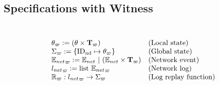 \subsection{Specifications with Witness} 
\label{chapter:witnesspassing:subsec:specifications-with-witness}

\begin{figure}
\raggedright
\noindent{}\\
$$
\begin{array}{ll}
\theta_\varpi:= (\theta \times {\textbf{T}_{\varpi}})  & \mbox{(Local state)} \\
\Sigma_\varpi := \{\mathrm{ID_{nd}} \mapsto \theta_\varpi\} & \mbox{(Global state)}\\
{\mathbb{E}_{net}}_\varpi:= {\mathbb{E}_{net}}~\vert~({\mathbb{E}_{net}} \times  {\textbf{T}_{\varpi}}) & \mbox{(Network event)}\\
{{l_{net}}}_{\varpi}:= \mbox{list}\ {\mathbb{E}_{net}}_\varpi & \mbox{(Network log)}\\
\mathbb{R}_\varpi : {{l_{net}}}_{\varpi} \rightarrow  \Sigma_\varpi& \mbox{(Log replay function)}\\
\end{array}
$$


\end{figure}

